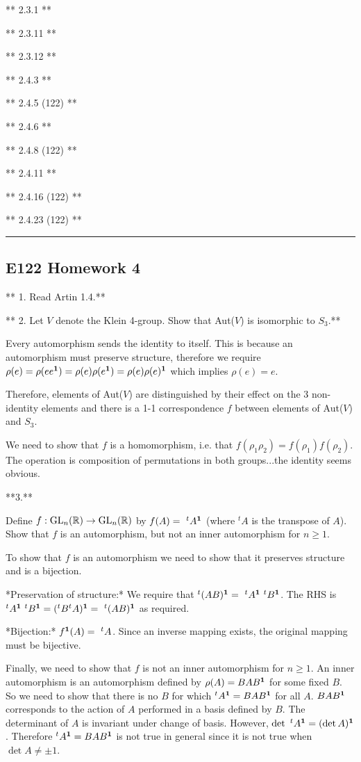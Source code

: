 ** 2.3.1 **

** 2.3.11 **

** 2.3.12 **

** 2.4.3 **

** 2.4.5 (122) **

** 2.4.6 **

** 2.4.8 (122) **

** 2.4.11 **

** 2.4.16 (122) **

** 2.4.23 (122) **


\hrule
\subsection{E122 Homework 4}
** 1. Read Artin 1.4.**

** 2. Let $V$ denote the Klein 4-group. Show that Aut($V$) is isomorphic to $S_3$.**

Every automorphism sends the identity to itself. This is because an
automorphism must preserve structure, therefore we require $\rho(e) =
\rho(ee^{\mathbf 1}) = \rho(e)\rho(e^{\mathbf 1}) = \rho(e)\rho(e)^{\mathbf 1}$ which implies $\rho(e) =
e$.

Therefore, elements of Aut($V$) are distinguished by their effect on the 3
non-identity elements and there is a 1-1 correspondence $f$ between elements of
Aut($V$) and $S_3$.

We need to show that $f$ is a homomorphism, i.e. that $f(\rho_1 \rho_2) =
f(\rho_1) f(\rho_2)$. The operation is composition of permutations in both
groups...the identity seems obvious.

**3.**

Define $f : \mathrm{GL}_n(\mathbb{R}) \rightarrow \mathrm{GL}_n(\mathbb{R})$ by $f(A) =~ ^tA^{\mathbf 1}$ (where $^tA$
is the transpose of $A$). Show that $f$ is an automorphism, but not an inner
automorphism for $n ≥ 1$.

To show that $f$ is an automorphism we need to show that it preserves structure
and is a bijection.

*Preservation of structure:* We require that $^t(AB)^{\mathbf 1} =~ ^tA^{\mathbf 1}~ ^tB^{\mathbf 1}$.
The RHS is $^tA^{\mathbf 1}~ ^tB^{\mathbf 1} = (^tB^tA)^{\mathbf 1} = ~^t(AB)^{\mathbf 1}$ as required.

*Bijection:* $f^{\mathbf 1}(A) =~ ^tA$. Since an inverse mapping exists, the original
mapping must be bijective.

Finally, we need to show that $f$ is not an inner automorphism for $n \geq
1$. An inner automorphism is an automorphism defined by $\rho(A) = BAB^{\mathbf 1}$ for
some fixed $B$. So we need to show that there is no $B$ for which $^tA^{\mathbf 1} =
BAB^{\mathbf 1}$ for all $A$. $BAB^{\mathbf 1}$ corresponds to the action of $A$ performed in a
basis defined by $B$. The determinant of $A$ is invariant under change of
basis. However, $\det ~^tA^{\mathbf 1} = (\det A)^{\mathbf 1}$. Therefore $^tA^{\mathbf 1} = BAB^{\mathbf 1}$ is
not true in general since it is not true when $\det A \neq \pm 1$.

